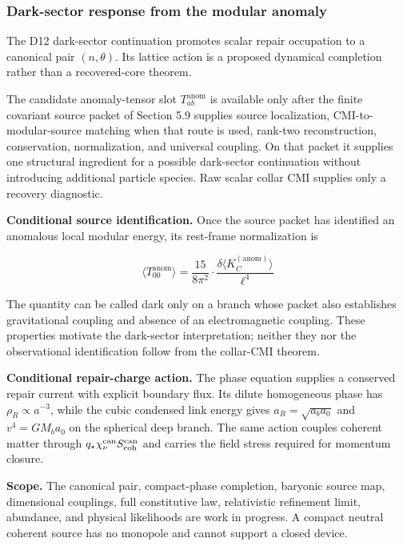 \subsubsection{Dark-sector response from the modular anomaly}\label{515-dark-matter-as-modular-anomaly}

The D12 dark-sector continuation promotes scalar repair occupation to a
canonical pair \((n,\theta)\). Its lattice action is a proposed dynamical
completion rather than a recovered-core theorem.

The candidate anomaly-tensor slot \(T_{ab}^{\mathrm{anom}}\) is available only
after the finite covariant source packet of Section 5.9 supplies source
localization, CMI-to-modular-source matching when that route is used,
rank-two reconstruction, conservation, normalization, and universal coupling.
On that packet it supplies one structural ingredient for a possible
dark-sector continuation without introducing additional particle species. Raw scalar
collar CMI supplies only a recovery diagnostic.

\textbf{Conditional source identification.} Once the source packet has
identified an anomalous local modular energy, its rest-frame normalization is

\[
\langle T_{00}^{\mathrm{anom}} \rangle
= \frac{15}{8\pi^2} \cdot \frac{\delta \langle K_C^{\mathrm{(anom)}} \rangle}{\ell^4}
\]

The quantity can be called dark only on a branch whose packet also establishes
gravitational coupling and absence of an electromagnetic coupling. These
properties motivate the dark-sector interpretation; neither they nor the
observational identification follow from the collar-CMI theorem.

\textbf{Conditional repair-charge action.} The phase equation supplies a
conserved repair current with explicit boundary flux. Its dilute homogeneous
phase has \(\rho_R\propto a^{-3}\), while the cubic condensed link energy gives
\(a_R=\sqrt{a_ba_0}\) and \(v^4=GM_ba_0\) on the spherical deep branch. The
same action couples coherent matter through
\(q_\star\chi_\nu^{\rm can}S_{\rm coh}^{\rm can}\) and carries the field stress
required for momentum closure.

\textbf{Scope.} The canonical pair, compact-phase completion, baryonic source
map, dimensional couplings, full constitutive law, relativistic refinement
limit, abundance, and physical likelihoods are work in progress. A compact
neutral coherent source has no monopole and cannot support a closed device.

